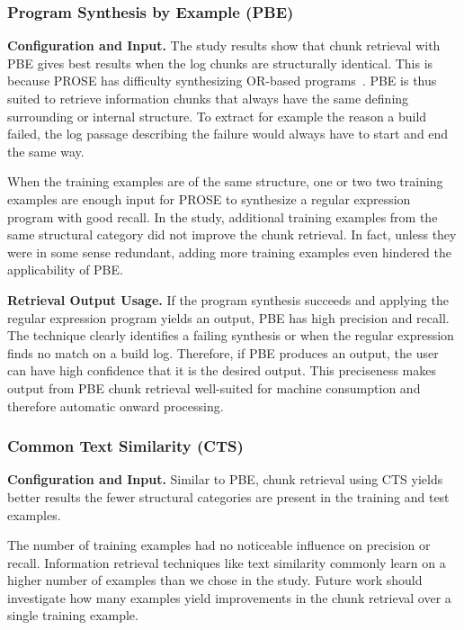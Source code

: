 \subsubsection{Program Synthesis by Example (PBE)}

\noindent
\textbf{Configuration and Input.}
The study results show that chunk retrieval with PBE gives best
results when the log chunks are structurally identical.
This is
because PROSE has difficulty synthesizing OR-based
programs~\cite{mayer2015user}.
PBE is thus suited to retrieve information
chunks that always have the same defining surrounding or internal
structure.
To extract for example the reason a build failed, the log
passage describing the failure would always have to start and
end the same way.

When the training examples are of the same structure, one or two
two training examples are enough input for PROSE to synthesize a regular
expression program with good recall.
In the study, additional training
examples from the same structural category
did not improve the chunk retrieval.
In fact, unless they
were in some sense redundant, adding more training examples even
hindered the applicability of PBE.

\noindent
\textbf{Retrieval Output Usage.}
If the program synthesis succeeds and applying the regular expression
program yields an output, PBE has high precision and recall.
The technique
clearly identifies a failing synthesis or when the regular expression
finds no match on a build log.
Therefore, if PBE produces
an output, the user can have high confidence that it is the desired
output.
This preciseness makes output from PBE chunk retrieval
well-suited for machine consumption and therefore automatic onward
processing.

\subsubsection{Common Text Similarity (CTS)}
\noindent
\textbf{Configuration and Input.}
Similar to PBE, chunk retrieval using CTS yields better results the
fewer structural categories are present in the training and test
examples.

The number of training examples had no noticeable influence on
precision or recall.
Information retrieval techniques
like text similarity commonly learn on a higher number of examples
than we chose in the study.
Future work should investigate how many
examples yield improvements in the chunk retrieval over a single
training example.

